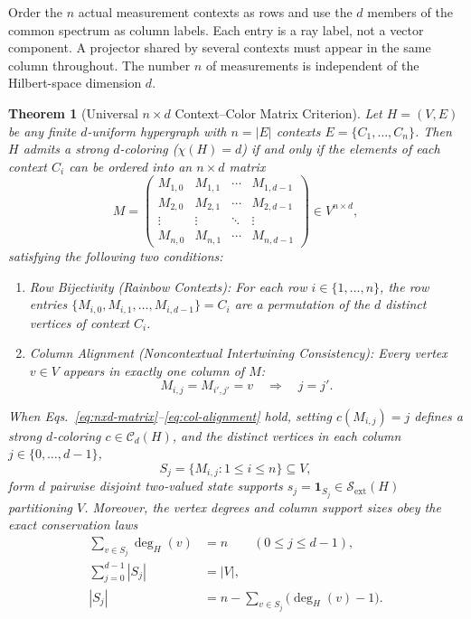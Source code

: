 \documentclass[aps,pra,reprint,superscriptaddress,longbibliography,nofootinbib,floatfix,10pt]{revtex4-2}
\newtheorem{theorem}{Theorem}
\theoremstyle{definition}\newtheorem{definition}[theorem]{Definition}
\theoremstyle{remark}\newtheorem{remark}[theorem]{Remark}
\newcommand{\Sc}{\mathcal S}\newcommand{\Cc}{\mathcal C}
\begin{document}
Order the $n$ actual measurement contexts as rows and use the $d$ members of the common spectrum as column labels. Each entry is a ray label, not a vector component. A projector shared by several contexts must appear in the same column throughout. The number $n$ of measurements is independent of the Hilbert-space dimension $d$.
\begin{theorem}[Universal $n\times d$ Context--Color Matrix Criterion]\label{thm:nxd-matrix}
Let $H=(V,E)$ be any finite $d$-uniform hypergraph with $n=|E|$ contexts $E=\{C_1,\ldots,C_n\}$. Then $H$ admits a strong $d$-coloring ($\chi(H)=d$) if and only if the elements of each context $C_i$ can be ordered into an $n\times d$ matrix
\begin{equation}\label{eq:nxd-matrix}
M=\begin{pmatrix}
M_{1,0} & M_{1,1} & \cdots & M_{1,d-1}\\
M_{2,0} & M_{2,1} & \cdots & M_{2,d-1}\\
\vdots  & \vdots  & \ddots & \vdots\\
M_{n,0} & M_{n,1} & \cdots & M_{n,d-1}
\end{pmatrix}\in V^{n\times d},
\end{equation}
satisfying the following two conditions:
\begin{enumerate}
\item \emph{Row Bijectivity (Rainbow Contexts):} For each row $i\in\{1,\ldots,n\}$, the row entries $\{M_{i,0},M_{i,1},\ldots,M_{i,d-1}\}=C_i$ are a permutation of the $d$ distinct vertices of context $C_i$.
\item \emph{Column Alignment (Noncontextual Intertwining Consistency):} Every vertex $v\in V$ appears in \emph{exactly one column} of $M$:
\begin{equation}\label{eq:col-alignment}
M_{i,j}=M_{i',j'}=v \quad\Longrightarrow\quad j=j'.
\end{equation}
\end{enumerate}
When Eqs.~\eqref{eq:nxd-matrix}--\eqref{eq:col-alignment} hold, setting $c(M_{i,j})=j$ defines a strong $d$-coloring $c\in\Cc_d(H)$, and the distinct vertices in each column $j\in\{0,\ldots,d-1\}$,
\begin{equation}\label{eq:col-state}
S_j=\{M_{i,j}:1\le i\le n\}\subseteq V,
\end{equation}
form $d$ pairwise disjoint two-valued state supports $s_j=\mathbf{1}_{S_j}\in\Sc_{\mathrm{ext}}(H)$ partitioning $V$. Moreover, the vertex degrees and column support sizes obey the exact conservation laws
\begin{align}
\sum_{v\in S_j}\deg_H(v) &= n \qquad (0\le j\le d-1),\label{eq:deg-conservation}\\
\sum_{j=0}^{d-1}|S_j| &= |V|,\label{eq:size-conservation}\\
|S_j| &= n - \sum_{v\in S_j}\bigl(\deg_H(v)-1\bigr).\label{eq:hinge-saving}
\end{align}
\end{theorem}
\end{document}
